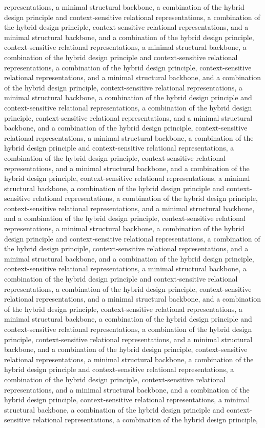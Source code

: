 representations, a minimal structural backbone, a combination of the hybrid design principle and context-sensitive relational representations, a combination of the hybrid design principle, context-sensitive relational representations, and a minimal structural backbone, and a combination of the hybrid design principle, context-sensitive relational representations, a minimal structural backbone, a combination of the hybrid design principle and context-sensitive relational representations, a combination of the hybrid design principle, context-sensitive relational representations, and a minimal structural backbone, and a combination of the hybrid design principle, context-sensitive relational representations, a minimal structural backbone, a combination of the hybrid design principle and context-sensitive relational representations, a combination of the hybrid design principle, context-sensitive relational representations, and a minimal structural backbone, and a combination of the hybrid design principle, context-sensitive relational representations, a minimal structural backbone, a combination of the hybrid design principle and context-sensitive relational representations, a combination of the hybrid design principle, context-sensitive relational representations, and a minimal structural backbone, and a combination of the hybrid design principle, context-sensitive relational representations, a minimal structural backbone, a combination of the hybrid design principle and context-sensitive relational representations, a combination of the hybrid design principle, context-sensitive relational representations, and a minimal structural backbone, and a combination of the hybrid design principle, context-sensitive relational representations, a minimal structural backbone, a combination of the hybrid design principle and context-sensitive relational representations, a combination of the hybrid design principle, context-sensitive relational representations, and a minimal structural backbone, and a combination of the hybrid design principle, context-sensitive relational representations, a minimal structural backbone, a combination of the hybrid design principle and context-sensitive relational representations, a combination of the hybrid design principle, context-sensitive relational representations, and a minimal structural backbone, and a combination of the hybrid design principle, context-sensitive relational representations, a minimal structural backbone, a combination of the hybrid design principle and context-sensitive relational representations, a combination of the hybrid design principle, context-sensitive relational representations, and a minimal structural backbone, and a combination of the hybrid design principle, context-sensitive relational representations, a minimal structural backbone, a combination of the hybrid design principle and context-sensitive relational representations, a combination of the hybrid design principle, context-sensitive relational representations, and a minimal structural backbone, and a combination of the hybrid design principle, context-sensitive relational representations, a minimal structural backbone, a combination of the hybrid design principle and context-sensitive relational representations, a combination of the hybrid design principle, 